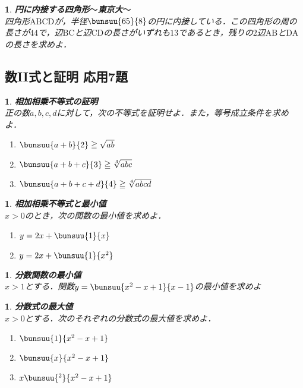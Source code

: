 \documentclass[10pt,
fleqn,
dvipdfmx,
uplatex
]{jsarticle}
\newtheorem{question}[Question]{}
\begin{document}
\begin{question}{\bf\boldmath 円に内接する四角形$〜$東京大$〜$}\\
四角形$\text{ABCD}$が，半径$\bunsuu{{{65}}}{8}$の円に内接している．この四角形の周の長さが${44}$で，辺$\text{BC}$と辺$\text{CD}$の長さがいずれも${13}$であるとき，残りの$2$辺$\text{AB}$と$\text{DA}$の長さを求めよ．
\end{question}

\subsection{数II式と証明 応用7題}



\begin{question}{\bf\boldmath 相加相乗不等式の証明}\\
正の数$a, b, c, d$に対して，次の不等式を証明せよ．また，等号成立条件を求めよ．
\begin{enumerate}
\item $\bunsuu{{a+b}}{2}\geqq \sqrt {ab}$
\item $\bunsuu{{a+b+c}}{3}\geqq \sqrt[3]{abc}$
\item $\bunsuu{{a+b+c+d}}{4}\geqq \sqrt[4]{abcd}$
\end{enumerate}

\end{question}



\begin{question}{\bf\boldmath 相加相乗不等式と最小値}\\
$x>0$のとき，次の関数の最小値を求めよ．
\begin{enumerate}
\item $y=2x+\bunsuu{1}{x}$
\item $y=2x+\bunsuu{1}{{}x^2}$
\end{enumerate}

\end{question}



\begin{question}{\bf\boldmath 分数関数の最小値}\\
$x>1$とする．関数$y=\bunsuu{{x^2-x+1}}{{x-1}}$の最小値を求めよ
\end{question}



\begin{question}{\bf\boldmath 分数式の最大値}\\
$x>0$とする．次のそれぞれの分数式の最大値を求めよ．
\begin{enumerate}
\item $\bunsuu{1}{{}x^2-x+1}$
\item $\bunsuu{x}{{}x^2-x+1}$
\item $x\bunsuu{^2}{{}x^2-x+1}$
\end{enumerate}

\end{question}
\end{document}
